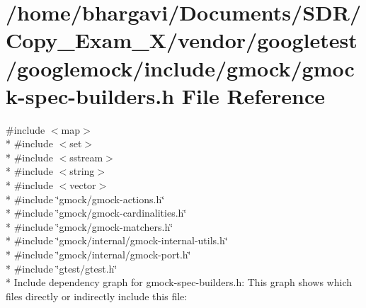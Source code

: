 \hypertarget{gmock-spec-builders_8h}{}\section{/home/bhargavi/\+Documents/\+S\+D\+R/\+Copy\+\_\+\+Exam\+\_\+X/vendor/googletest/googlemock/include/gmock/gmock-\/spec-\/builders.h File Reference}
\label{gmock-spec-builders_8h}
{\ttfamily \#include $<$map$>$}\\*
{\ttfamily \#include $<$set$>$}\\*
{\ttfamily \#include $<$sstream$>$}\\*
{\ttfamily \#include $<$string$>$}\\*
{\ttfamily \#include $<$vector$>$}\\*
{\ttfamily \#include \char`\"{}gmock/gmock-\/actions.\+h\char`\"{}}\\*
{\ttfamily \#include \char`\"{}gmock/gmock-\/cardinalities.\+h\char`\"{}}\\*
{\ttfamily \#include \char`\"{}gmock/gmock-\/matchers.\+h\char`\"{}}\\*
{\ttfamily \#include \char`\"{}gmock/internal/gmock-\/internal-\/utils.\+h\char`\"{}}\\*
{\ttfamily \#include \char`\"{}gmock/internal/gmock-\/port.\+h\char`\"{}}\\*
{\ttfamily \#include \char`\"{}gtest/gtest.\+h\char`\"{}}\\*
Include dependency graph for gmock-\/spec-\/builders.h\+:
This graph shows which files directly or indirectly include this file\+:
